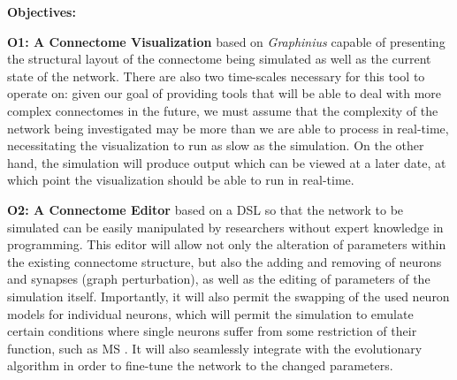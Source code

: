 \documentclass[a4paper,11pt]{article}
\begin{document}
\textbf{Objectives:}

\textbf{O1: A Connectome Visualization} based on \emph{Graphinius} capable of presenting the structural layout of the connectome being simulated as well as the current state of the network. There are also two time-scales necessary for this tool to operate on: given our goal of providing tools that will be able to deal with more complex connectomes in the future, we must assume that the complexity of the network being investigated may be more than we are able to process in real-time, necessitating the visualization to run as slow as the simulation. On the other hand, the simulation will produce output which can be viewed at a later date, at which point the visualization should be able to run in real-time.

\textbf{O2: A Connectome Editor} based on a DSL so that the network to be simulated can be easily manipulated by researchers without expert knowledge in programming. This editor will allow not only the alteration of parameters within the existing connectome structure, but also the adding and removing of neurons and synapses (graph perturbation), as well as the editing of parameters of the simulation itself. Importantly, it will also permit the swapping of the used neuron models for individual neurons, which will permit the simulation to emulate certain conditions where single neurons suffer from some restriction of their function, such as MS \citep{Hauser2006}. It will also seamlessly integrate with the evolutionary algorithm in order to fine-tune the network to the changed parameters.
\\[0,2cm]


\end{document}
